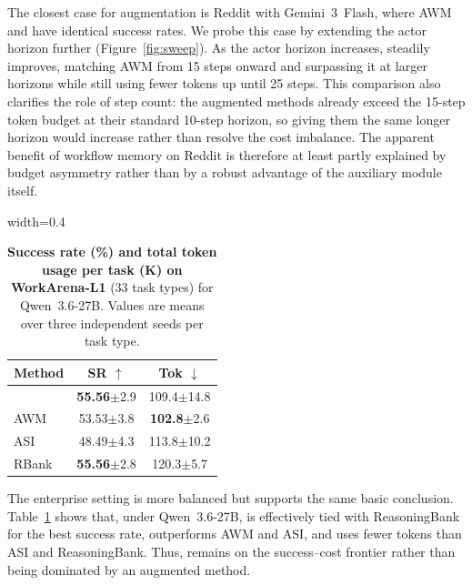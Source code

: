 The closest case for augmentation is Reddit with Gemini~3~Flash, where AWM and \budgetactor{} have identical success rates.
We probe this case by extending the \budgetactor{} actor horizon further (Figure~\ref{fig:sweep}).
As the actor horizon increases, \budgetactor{} steadily improves, matching AWM from 15 steps onward and surpassing it at larger horizons while still using fewer tokens up until 25 steps.
This comparison also clarifies the role of step count: the augmented methods already exceed the 15-step \budgetactor{} token budget at their standard 10-step horizon, so giving them the same longer horizon would increase rather than resolve the cost imbalance.
The apparent benefit of workflow memory on Reddit is therefore at least partly explained by budget asymmetry rather than by a robust advantage of the auxiliary module itself.

\begin{table}[t]
\centering
\small
\begin{adjustbox}{width=0.4\textwidth}{
\begin{tabular}{lcc}
\toprule
\textbf{Method} & \textbf{SR $\uparrow$} & \textbf{Tok $\downarrow$} \\
\midrule
\budgetactor{} & \textbf{55.56}{\scriptsize $\pm$2.9} & 109.4{\scriptsize $\pm$14.8} \\
AWM       & 53.53{\scriptsize $\pm$3.8} & \textbf{102.8}{\scriptsize $\pm$2.6} \\
ASI       & 48.49{\scriptsize $\pm$4.3} & 113.8{\scriptsize $\pm$10.2} \\
RBank     & \textbf{55.56}{\scriptsize $\pm$2.8} & 120.3{\scriptsize $\pm$5.7} \\
\bottomrule
\end{tabular}
}\end{adjustbox}
\caption{\textbf{Success rate (\%) and total token usage per task (K) on WorkArena-L1} (33 task types) for Qwen~3.6-27B. Values are means over three independent seeds per task type.}
\label{tab:main:workarena}
\end{table}

 The enterprise setting is more balanced but supports the same basic conclusion.
Table~\ref{tab:main:workarena} shows that, under Qwen~3.6-27B, \mbox{\budgetactor{}} is effectively tied with ReasoningBank for the best success rate, outperforms AWM and ASI, and uses fewer tokens than ASI and ReasoningBank.
Thus, \budgetactor{} remains on the success--cost frontier rather than being dominated by an augmented method.

